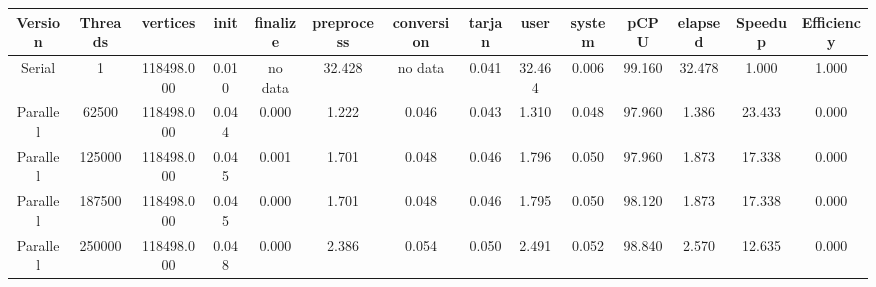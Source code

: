 \begin{tabular}{|c|c|c|c|c|c|c|c|c|c|c|c|c|c|}
\toprule
 Version &  Threads &   vertices &  init & finalize &  preprocess & conversion &  tarjan &   user &  system &   pCPU &  elapsed &  Speedup &  Efficiency \\
\midrule
  Serial &        1 & 118498.000 & 0.010 &  no data &      32.428 &    no data &   0.041 & 32.464 &   0.006 & 99.160 &   32.478 &    1.000 &       1.000 \\
Parallel &    62500 & 118498.000 & 0.044 &    0.000 &       1.222 &      0.046 &   0.043 &  1.310 &   0.048 & 97.960 &    1.386 &   23.433 &       0.000 \\
Parallel &   125000 & 118498.000 & 0.045 &    0.001 &       1.701 &      0.048 &   0.046 &  1.796 &   0.050 & 97.960 &    1.873 &   17.338 &       0.000 \\
Parallel &   187500 & 118498.000 & 0.045 &    0.000 &       1.701 &      0.048 &   0.046 &  1.795 &   0.050 & 98.120 &    1.873 &   17.338 &       0.000 \\
Parallel &   250000 & 118498.000 & 0.048 &    0.000 &       2.386 &      0.054 &   0.050 &  2.491 &   0.052 & 98.840 &    2.570 &   12.635 &       0.000 \\
\bottomrule
\end{tabular}

